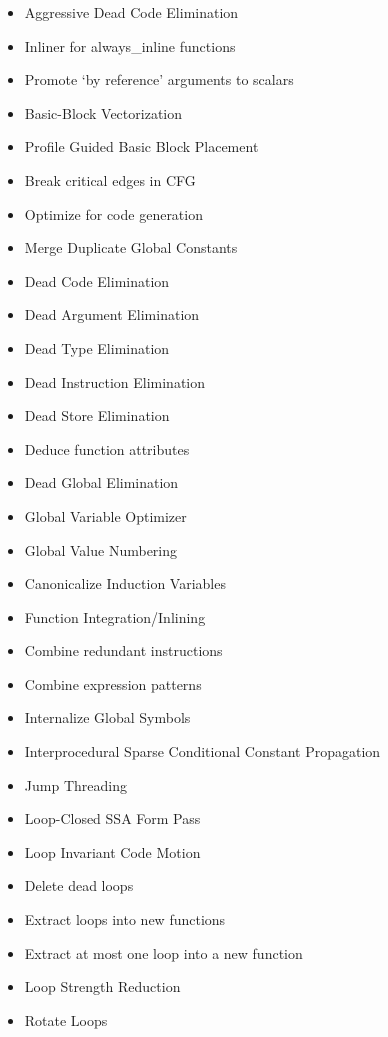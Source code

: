 \begin{multicols}{3}
\begin{itemize}
\scriptsize
     \item Aggressive Dead Code Elimination
     \item Inliner for always\_inline functions
     \item Promote ‘by reference’ arguments to scalars
     \item Basic-Block Vectorization
     \item Profile Guided Basic Block Placement
     \item Break critical edges in CFG
     \item Optimize for code generation
     \item Merge Duplicate Global Constants
     \item Dead Code Elimination
     \item Dead Argument Elimination
     \item Dead Type Elimination
     \item Dead Instruction Elimination
     \item Dead Store Elimination
     \item Deduce function attributes
     \item Dead Global Elimination
     \item Global Variable Optimizer
     \item Global Value Numbering
     \item Canonicalize Induction Variables
     \item Function Integration/Inlining
     \item Combine redundant instructions
     \item Combine expression patterns
     \item Internalize Global Symbols
     \item Interprocedural Sparse Conditional Constant Propagation
     \item Jump Threading
     \item Loop-Closed SSA Form Pass
     \item Loop Invariant Code Motion
     \item Delete dead loops
     \item Extract loops into new functions
     \item Extract at most one loop into a new function
     \item Loop Strength Reduction
     \item Rotate Loops

\end{itemize}
\end{multicols}

